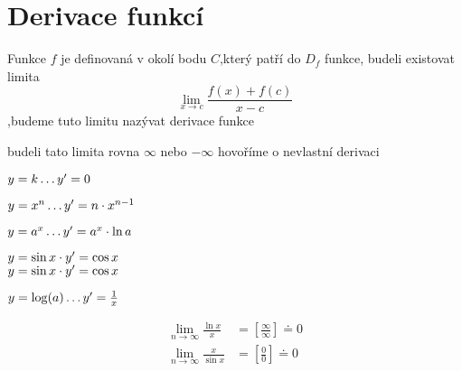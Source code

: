 \section*{Derivace funkcí}
\begin{definition}
    Funkce $f$ je definovaná v okolí bodu $C$,který patří do $D_f$ funkce, budeli existovat limita \[\lim_{x\rightarrow c}{\frac{f(x) + f(c)}{x-c}}\],budeme tuto limitu nazývat derivace funkce
\end{definition}
\begin{definition}
    budeli tato limita rovna $\infty$ nebo $-\infty$ hovoříme o nevlastní derivaci
\end{definition}
\begin{vzor}
    $y=k\dots y'=0$
\end{vzor}
\begin{vzor}
    $y=x^n\dots y'=n\cdot x^{n-1}$
\end{vzor}
\begin{vzor}$y= a^x \dots y'=a^x \cdot \ln{a}$ \end{vzor}
\begin{vzor}$y=\sin{x} \cdot y'=\cos{x}$\\$ y=\sin{x} \cdot y'=\cos{x}$\end{vzor}
\begin{vzor}
    $y=\log(a) \dots y'=\frac{1}{x}$
\end{vzor}
\begin{align*}
    \lim_{n\rightarrow \infty}{\frac{\ln{x}}{x}} &= \left[\frac{\infty}{\infty}\right] \doteq 0 \\
    \lim_{n\rightarrow\infty}{\frac{x}{\sin{x}}} &= \left[\frac{0}{0}\right] \doteq 0
\end{align*}

